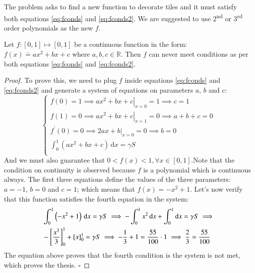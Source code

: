 The problem asks to find a new function to decorate tiles and it must 
satisfy both equations \ref{eq:fconds} and \ref{eq:fconds2}.
We are suggested to use 2\textsuperscript{nd} or 3\textsuperscript{rd} 
order polynomials as the new $f$.

\begin{proposition}
\label{the:2degpoly}
Let $f:[0,1] \mapsto [0,1]$ be a continuous function in the form: 
$f(x) \doteq ax^2+bx+c$ where $a,b,c \in \mathbb{R}$. 
Then $f$ can never meet conditions as per both
equations \ref{eq:fconds} and \ref{eq:fconds2}.
\begin{proof}
To prove this, we need to plug $f$ inside equations \ref{eq:fconds} and 
\ref{eq:fconds2} and generate a system of equations on parameters $a$, 
$b$ and $c$:
\begin{equation*}
\begin{cases}
f(0)=1 \implies \left. ax^2+bx+c \right|_{x=0} = 1 \implies c = 1 \\
f(1)=0 \implies \left. ax^2+bx+c \right|_{x=1} = 0 \implies a+b+c=0\\
f^\prime(0) = 0 \implies \left. 2ax + b \right|_{x=0} = 0 \implies b = 0 \\
\int^{1}_{0} \left( ax^2+bx+c \right) \, \mathrm{d} x = \gamma S \\
\end{cases}
\end{equation*}
And we must also guarantee that $0 < f(x) < 1, \forall x \in [0,1]. 
$Note that the condition on continuity is observed because $f$ is a polynomial which
is continuous always. 
The first three equations define the values of the three parameters: 
$a=-1$, $b=0$ and $c=1$; which means that $f(x) = -x^2 + 1$. Let's now
verify that this function satisfies the fourth equation in the system:
\begin{align*}
&\int^{1}_{0} \left( -x^2+1 \right) \, \mathrm{d} x = \gamma S
\implies
-\int^{1}_{0} x^2 \, \mathrm{d} x + \int^{1}_{0} \mathrm{d} x = 
        \gamma S \implies \notag\\
&- \left[\frac{x^3}{3}\right]_0^1 + \left[x\right]_0^1 = \gamma S
\implies -\frac{1}{3} + 1 = \frac{55}{100} \cdot 1
\implies \frac{2}{3} = \frac{55}{100}
\end{align*}
The equation above proves that the fourth condition is the system is not met, which
proves the thesis.
$\square$
\end{proof}
\end{proposition}
